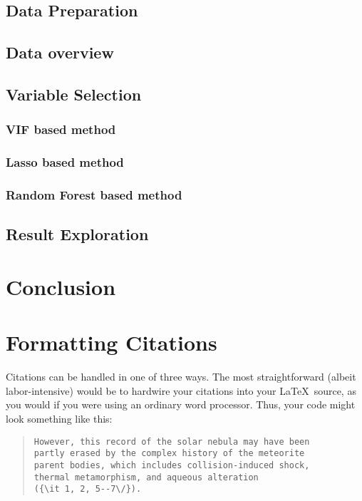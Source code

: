 \documentclass[12pt]{article}
\begin{document}
\subsection{Data Preparation}
\subsection{Data overview}
\subsection{Variable Selection}
\subsubsection{VIF based method}
\subsubsection{Lasso based method}
\subsubsection{Random Forest based method}

\subsection{Result Exploration}

\section{Conclusion}

\iffalse \section*{Formatting Citations}

Citations can be handled in one of three ways.  The most
straightforward (albeit labor-intensive) would be to hardwire your
citations into your \LaTeX\ source, as you would if you were using an
ordinary word processor.  Thus, your code might look something like
this:


\begin{quote}
\begin{verbatim}
However, this record of the solar nebula may have been
partly erased by the complex history of the meteorite
parent bodies, which includes collision-induced shock,
thermal metamorphism, and aqueous alteration
({\it 1, 2, 5--7\/}).
\end{verbatim}
\end{quote}
\end{document}
